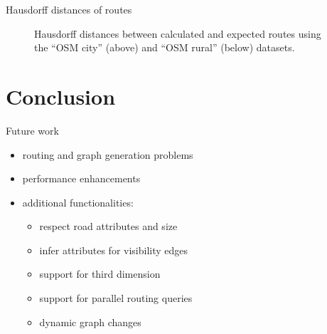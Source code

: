\documentclass[xcolor={x11names}]{beamer}
\newenvironment{figcenter}
{%
	\parskip=0pt%
	\par%
	\nopagebreak%
	\centering%
}%
{%
	\par%
	\noindent%
	\ignorespacesafterend%
}
\begin{document}
		\begin{frame}{Hausdorff distances of routes}
			\begin{figure}
				\begin{figcenter}
					\scalebox{0.66}
					{
						
					}
					\scalebox{0.66}
					{
						
					}
				\end{figcenter}
				\caption{Hausdorff distances between calculated and expected routes using the \enquote{OSM city} (above) and \enquote{OSM rural} (below) datasets.}
			\end{figure}
		\end{frame}
	
	\section{Conclusion}
	
		\begin{frame}{Future work}
			\begin{itemize}
				\item routing and graph generation problems
				\item performance enhancements
				\item additional functionalities:
				\begin{itemize}
					\item respect road attributes and size
					\item infer attributes for visibility edges
					\item support for third dimension
					\item support for parallel routing queries
					\item dynamic graph changes
				\end{itemize}
			\end{itemize}
		\end{frame}
\end{document}
